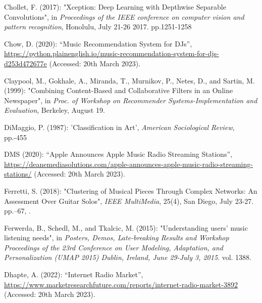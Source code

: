 \documentclass[11pt,titlepage,oneside]{book}
\begin{document}
\begin{thebibliography}{97}
	Chollet, F. (2017): "Xception: {Deep} {Learning} with {Depthwise}
		{Separable} {Convolutions}", in \textit{Proceedings of the IEEE conference on computer vision and pattern recognition}, Honolulu, July 21-26 2017. pp.1251-1258 
	
	Chow, D. (2020): \enquote{Music {Recommendation} {System} for {DJs}},
	\urlprefix\url{https://python.plainenglish.io/music-recommendation-system-for-djs-d253d472677e} (Accessed: 20th March 2023).
	
	Claypool, M., Gokhale, A., Miranda, T., Murnikov, P., Netes, D., and Sartin, M.
	(1999): "Combining {Content}-{Based} and {Collaborative} {Filters} in
		an {Online} {Newspaper}", in \textit{Proc. of Workshop on Recommender Systems-Implementation and Evaluation}, Berkeley, August 19.
	
	DiMaggio, P. (1987): 'Classification in {Art}', \textit{American
		Sociological Review}, pp.-455
	
	DMS (2020): \enquote{Apple {Announces} {Apple} {Music} {Radio} {Streaming}
		{Stations}},
	\urlprefix\url{https://deanemediasolutions.com/apple-announces-apple-music-radio-streaming-stations/} (Accessed: 20th March 2023).
	
	Ferretti, S. (2018): "Clustering of {Musical} {Pieces} {Through}
		{Complex} {Networks}: {An} {Assessment} {Over} {Guitar} {Solos}",
	\textit{IEEE MultiMedia}, 25(4), San Diego, July 23-27. pp.--67,
	.
	
	Ferwerda, B., Schedl, M., and Tkalcic, M. (2015): "Understanding users' music listening needs", in \textit{Posters, {Demos}, {Late}-breaking {Results} and {Workshop}
		{Proceedings} of the 23rd {Conference} on {User} {Modeling}, {Adaptation},
		and {Personalization} ({UMAP} 2015) {Dublin}, {Ireland}, {June} 29-{July} 3,
		2015}. vol. 1388.
	
	Dhapte, A. (2022): \enquote{Internet {Radio} {Market}},
	\urlprefix\url{https://www.marketresearchfuture.com/reports/internet-radio-market-3892} (Accessed: 20th March 2023).
	

\end{thebibliography}
\end{document}
